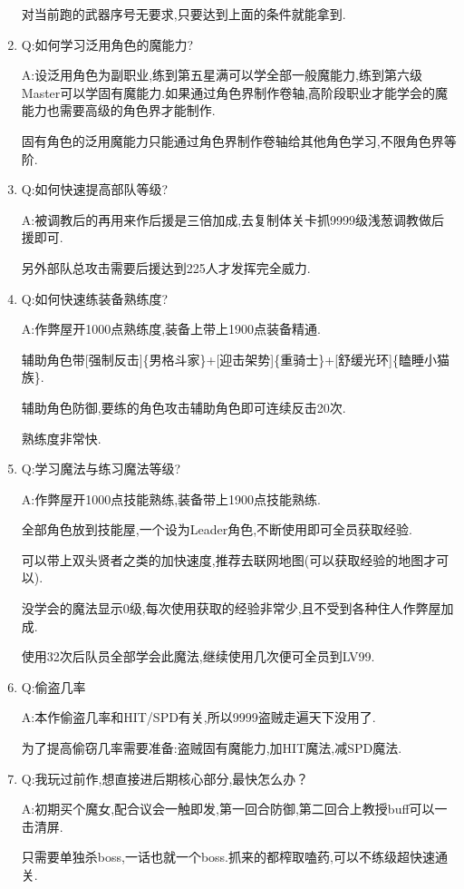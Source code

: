 \begin{enumerate}
	对当前跑的武器序号无要求,只要达到上面的条件就能拿到.

	\item
	Q:如何学习泛用角色的魔能力?

	A:设泛用角色为副职业,练到第五星满可以学全部一般魔能力,练到第六级Master可以学固有魔能力.如果通过角色界制作卷轴,高阶段职业才能学会的魔能力也需要高级的角色界才能制作.

	固有角色的泛用魔能力只能通过角色界制作卷轴给其他角色学习,不限角色界等阶.

	\item
	Q:如何快速提高部队等级?

	A:被调教后的再用来作后援是三倍加成,去复制体关卡抓9999级浅葱调教做后援即可.

	另外部队总攻击需要后援达到225人才发挥完全威力.

	\item
	Q:如何快速练装备熟练度?

	A:作弊屋开1000点熟练度,装备上带上1900点装备精通.

	辅助角色带[强制反击]\{男格斗家\}+[迎击架势]\{重骑士\}+[舒缓光环]\{瞌睡小猫族\}.

	辅助角色防御,要练的角色攻击辅助角色即可连续反击20次.

	熟练度非常快.

	\item
	Q:学习魔法与练习魔法等级?
	
	A:作弊屋开1000点技能熟练,装备带上1900点技能熟练.

	全部角色放到技能屋,一个设为Leader角色,不断使用即可全员获取经验.

	可以带上双头贤者之类的加快速度,推荐去联网地图(可以获取经验的地图才可以).

	没学会的魔法显示0级,每次使用获取的经验非常少,且不受到各种住人作弊屋加成.

	使用32次后队员全部学会此魔法,继续使用几次便可全员到LV99.

	\item
	Q:偷盗几率

	A:本作偷盗几率和HIT/SPD有关,所以9999盗贼走遍天下没用了.

	为了提高偷窃几率需要准备:盗贼固有魔能力,加HIT魔法,减SPD魔法.

	\item
	Q:我玩过前作,想直接进后期核心部分,最快怎么办？

	A:初期买个魔女,配合议会一触即发,第一回合防御,第二回合上教授buff可以一击清屏.

	只需要单独杀boss,一话也就一个boss.抓来的都榨取嗑药,可以不练级超快速通关.


\end{enumerate}
